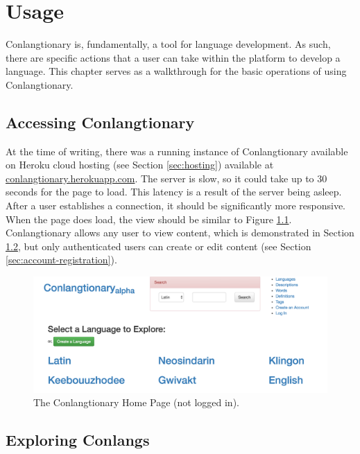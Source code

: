 \chapter{Usage}
\label{chap:usage}

Conlangtionary is, fundamentally, a tool for language development. As such, there are specific actions that a user can take within the platform to develop a language. This chapter serves as a walkthrough for the basic operations of using Conlangtionary.

\section{Accessing Conlangtionary}
\label{sec:accessing-conlangtionary}

At the time of writing, there was a running instance of Conlangtionary available on Heroku cloud hosting (see Section \ref{sec:hosting}) available at \url{conlangtionary.herokuapp.com}. The server is slow, so it could take up to 30 seconds for the page to load. This latency is a result of the server being asleep. After a user establishes a connection, it should be significantly more responsive. When the page does load, the view should be similar to Figure \ref{fig:home-not-logged-in}. Conlangtionary allows any user to view content, which is demonstrated in Section \ref{sec:exploring-conlangs}, but only authenticated users can create or edit content (see Section \ref{sec:account-registration}).

\begin{figure}[h]
\includegraphics[width=\textwidth]{figures/home-not-logged-in}
\caption{The Conlangtionary Home Page (not logged in).}
\centering
\label{fig:home-not-logged-in}
\end{figure}

\section{Exploring Conlangs}
\label{sec:exploring-conlangs}

